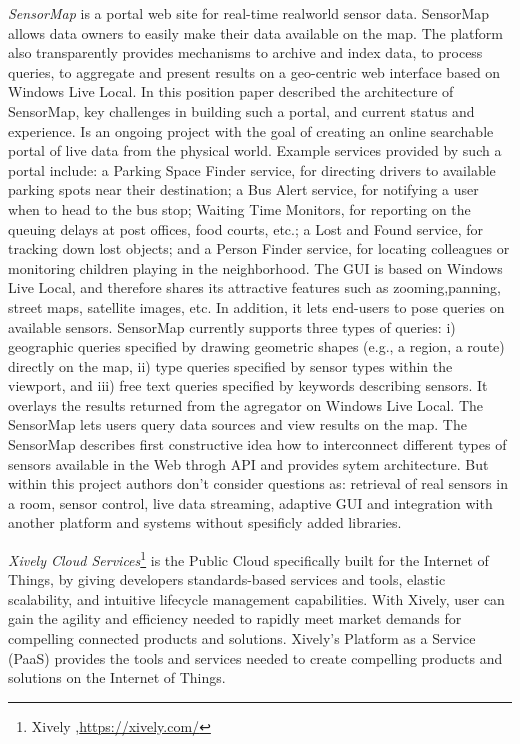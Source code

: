    \emph{SensorMap}\cite{nath2006challenges} is a portal web site for real-time realworld sensor data. SensorMap allows data owners to easily make their data available on the map. The platform also transparently provides mechanisms to archive and index data, to process queries, to aggregate and present results on a geo-centric web interface based on Windows Live Local. In this position paper  described the architecture of SensorMap, key challenges in building such a portal, and current status and experience. Is an ongoing project with the goal of creating an online searchable portal of live data from the physical world. Example services provided by such a portal include: a Parking Space Finder service, for directing drivers to available parking spots near their destination; a Bus Alert service, for notifying a user when to head to the bus stop; Waiting Time Monitors, for reporting on the queuing delays at post offices, food courts, etc.; a Lost and Found service, for tracking down lost objects; and a Person Finder service, for locating colleagues or monitoring children playing in the neighborhood. The GUI is based on Windows Live Local, and therefore shares its attractive features such as zooming,panning, street maps, satellite images, etc. In addition, it lets end-users to pose queries on available sensors. SensorMap currently supports three types of queries: i) geographic queries specified by drawing geometric shapes (e.g., a region, a route) directly on the map, ii) type queries specified by sensor types within the viewport, and iii) free text queries specified by keywords describing sensors. It overlays the results returned from the agregator on Windows Live Local. The SensorMap lets users query data sources and view results on the map. The SensorMap describes first constructive idea how to interconnect different types of sensors available in the Web throgh API and provides sytem architecture. But within this project authors don't consider questions as: retrieval of real sensors in a room, sensor control, live data streaming, adaptive GUI and integration with another platform and systems without spesificly added libraries. 

    \emph{Xively Cloud Services}\footnote{Xively ,\url{https://xively.com/}} is the Public Cloud specifically built for the Internet of Things, by giving developers standards-based services and tools, elastic scalability, and intuitive lifecycle management capabilities. With Xively, user can gain the agility and efficiency needed to rapidly meet market demands for compelling connected products and solutions. Xively’s Platform as a Service (PaaS) provides the tools and services needed to create compelling products and solutions on the Internet of Things.

